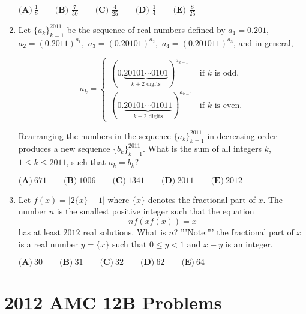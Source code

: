 \documentclass{article}
\begin{document}
\begin{enumerate}[label=\arabic*., itemsep=0.5em]
\( \textbf{(A)}\ \frac{1}{8}\qquad\textbf{(B) }\frac{7}{50}\qquad\textbf{(C) }\frac{4}{25}\qquad\textbf{(D) }\frac{1}{4}\qquad\textbf{(E) }\frac{8}{25} \)\par \vspace{0.5em}\item Let \(\{a_k\}_{k=1}^{2011}\) be the sequence of real numbers defined by \(a_1=0.201,\) \(a_2=(0.2011)^{a_1},\) \(a_3=(0.20101)^{a_2},\) \(a_4=(0.201011)^{a_3}\), and in general, 


\begin{equation*}
a_k=\begin{cases}
(0.\underbrace{20101\cdots 0101}_{k+2\text{ digits}})^{a_{k-1}} & \text{if }k\text{ is odd,}\\
(0.\underbrace{20101\cdots 01011}_{k+2\text{ digits}})^{a_{k-1}}& \text{if }k\text{ is even.}
\end{cases}
\end{equation*}


Rearranging the numbers in the sequence  \(\{a_k\}_{k=1}^{2011}\) in decreasing order produces a new sequence  \(\{b_k\}_{k=1}^{2011}\).  What is the sum of all integers \(k\), \(1\le k \le 2011\), such that \(a_k=b_k?\)

\( \textbf{(A)}\ 671\qquad\textbf{(B)}\ 1006\qquad\textbf{(C)}\ 1341\qquad\textbf{(D)}\ 2011\qquad\textbf{(E)}\ 2012 \)\par \vspace{0.5em}\item Let \(f(x)=|2\{x\}-1|\) where \(\{x\}\) denotes the fractional part of \(x\).  The number \(n\) is the smallest positive integer such that the equation 
\begin{equation*}
nf(xf(x))=x
\end{equation*}
 has at least \(2012\) real solutions.  What is \(n\)?  '''Note:''' the fractional part of \(x\) is a real number \(y=\{x\}\) such that \(0\le y<1\) and \(x-y\) is an integer.

\( \textbf{(A)}\ 30\qquad\textbf{(B)}\ 31\qquad\textbf{(C)}\ 32\qquad\textbf{(D)}\ 62\qquad\textbf{(E)}\ 64 \)\par \vspace{0.5em}
\end{enumerate}
\newpage\section*{2012 AMC 12B Problems}
\end{document}
